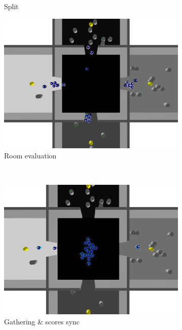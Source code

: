 \begin{figure}[h!]
\begin{subfigure}[b]{0.5\textwidth}
            \caption{Split}
        \end{subfigure}
        \hfill
        \begin{subfigure}[b]{0.5\textwidth}
            \includegraphics[width=\textwidth]{images/3_evaluate.png}
            \caption{Room evaluation}
        \end{subfigure}%
        ~
        \begin{subfigure}[b]{0.5\textwidth}
            \includegraphics[width=\textwidth]{images/4_sync.png}
            \caption{Gathering \& scores sync}
        \end{subfigure}
        \hfill
        \begin{subfigure}[b]{0.5\textwidth}

\end{subfigure}
\end{figure}
